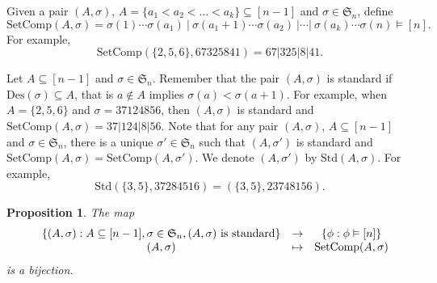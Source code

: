 \documentclass[11pt]{amsart}
\newtheorem{Proposition}[Theorem]{Proposition}
\numberwithin{equation}{section}
\newcommand{\SetComp}{\mathrm{SetComp}}
\newcommand{\std}{\mathrm{Std}}
\newcommand{\Des}{\mathrm{Des}}
\newcommand{\frakS}{{\mathfrak{S}}}
\begin{document}


Given a pair $(A,\sigma)$, $A=\{a_1<a_2<\dots<a_k \}\subseteq [n-1]$ and $\sigma\in \frakS_n$, define 
\[\SetComp(A,\sigma)=\sigma(1)\cdots \sigma(a_1)~|~\sigma(a_1+1)\cdots \sigma(a_2)~|\cdots |~ \sigma(a_k) \cdots \sigma(n)\vDash [n].\]
For example, 
$$\SetComp(\{2,5,6\},67325841)=67|325|8|41.$$


%






	Let  $A\subseteq[n-1]$ and $\sigma\in\mathfrak{S}_n$. Remember that the pair $(A,\sigma)$ is {standard} if  $\Des(\sigma)\subseteq A$, that is $a\notin A$ implies $\sigma(a)<\sigma(a+1)$. 
	For example, when  $A=\{2,5,6\}$ and $\sigma = 37124856$, then $(A,\sigma)$ is standard and $\SetComp(A,\sigma)=37|124|8|56$. 
Note that for any pair $(A,\sigma)$, $A\subseteq [n-1]$ and $\sigma\in \frakS_n$, there is a unique $\sigma'\in\mathfrak{S}_n$ such that $(A,\sigma')$ is standard and $\SetComp(A,\sigma)=\SetComp(A,\sigma')$. We denote $(A,\sigma')$ by $\std(A,\sigma)$. 
For example,
$$\std(\{3,5\},37284516)=(\{3,5\},23748156).$$

\begin{Proposition}\label{prop:std}
The map 
$$\begin{array}{cccc}
& \{ (A,\sigma): A\subseteq [n-1], \sigma\in \frakS_n,  (A,\sigma)~ {\rm is~ standard}\}& \rightarrow & \{ \phi: \phi\vDash[n]\} \\
& (A,\sigma)  & \mapsto & \SetComp(A,\sigma)
\end{array}$$
is a bijection. 	
	
\end{Proposition}
\end{document}
